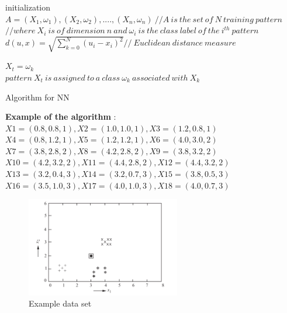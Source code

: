 \begin{algorithm}[H]
\SetAlgoLined

 initialization\;
 $ A=(X_{1},\omega_{1}),(X_{2},\omega_{2}),....,(X_{n},\omega_{n}) \ // A\ is\ the\ set\ of\ N\ training\ pattern $\\
 
 
$ //where\  X_{i}\ is\ of\ dimension\ n\ and\  \omega_{i}\ is\ the\ class\ label\ of\ the\ i^{th}\ pattern $\\
 
 
 $d(u,x) = \sqrt{\sum_{k=0}^{N} (u_{i}-x_{i})^{2}}  // \ Euclidean\ distance\ measure $\\ 

 
 $ X_{t} = \omega_{k} $ \\
 
 $ pattern\ X_{t}\ is\ assigned\ to\ a\ class\ \omega_{k}\ associated\ with\  X_{k} $
 
 \caption{Algorithm for NN}
\end{algorithm}

\vspace{5mm}
\textbf{Example of the algorithm} :\newline 
$ X1 = (0.8, 0.8, 1), X2 = (1.0, 1.0, 1), X3 = (1.2, 0.8, 1)$\\
$X4 = (0.8, 1.2, 1), X5 = (1.2, 1.2, 1), X6 = (4.0, 3.0, 2)$\\
$X7 = (3.8, 2.8, 2), X8 = (4.2, 2.8, 2), X9 = (3.8, 3.2, 2)$\\
$X10 = (4.2, 3.2, 2), X11 = (4.4, 2.8, 2), X12 = (4.4, 3.2, 2)$\\
$X13 = (3.2, 0.4, 3), X14 = (3.2, 0.7, 3), X15 = (3.8, 0.5, 3)$\\
$X16 = (3.5, 1.0, 3), X17 = (4.0, 1.0, 3), X18 = (4.0, 0.7, 3)$


\begin{figure}[H]
\centering
\includegraphics[width=0.6\textwidth]{img/nn-example.PNG}
\caption{ Example data set }
\label{fig:NN}
\end{figure}

